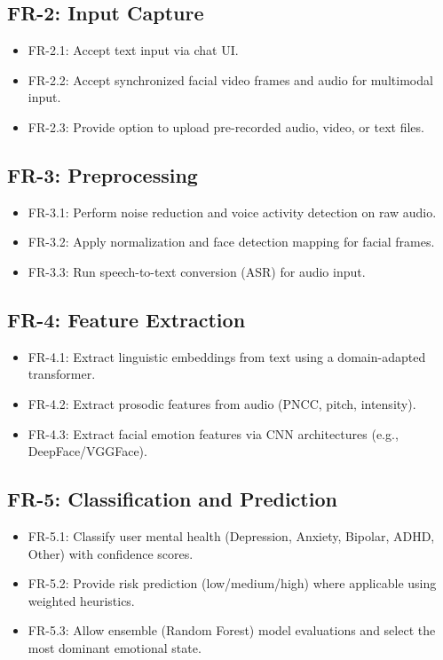 \documentclass[11pt]{report}
\begin{document}
\subsection{FR-2: Input Capture}
\begin{itemize}
    \item FR-2.1: Accept text input via chat UI.
    \item FR-2.2: Accept synchronized facial video frames and audio for multimodal input.
    \item FR-2.3: Provide option to upload pre-recorded audio, video, or text files.
\end{itemize}

\subsection{FR-3: Preprocessing}
\begin{itemize}
    \item FR-3.1: Perform noise reduction and voice activity detection on raw audio.
    \item FR-3.2: Apply normalization and face detection mapping for facial frames.
    \item FR-3.3: Run speech-to-text conversion (ASR) for audio input.
\end{itemize}

\subsection{FR-4: Feature Extraction}
\begin{itemize}
    \item FR-4.1: Extract linguistic embeddings from text using a domain-adapted transformer.
    \item FR-4.2: Extract prosodic features from audio (PNCC, pitch, intensity).
    \item FR-4.3: Extract facial emotion features via CNN architectures (e.g., DeepFace/VGGFace).
\end{itemize}

\subsection{FR-5: Classification and Prediction}
\begin{itemize}
    \item FR-5.1: Classify user mental health (Depression, Anxiety, Bipolar, ADHD, Other) with confidence scores.
    \item FR-5.2: Provide risk prediction (low/medium/high) where applicable using weighted heuristics.
    \item FR-5.3: Allow ensemble (Random Forest) model evaluations and select the most dominant emotional state.
\end{itemize}
\end{document}
